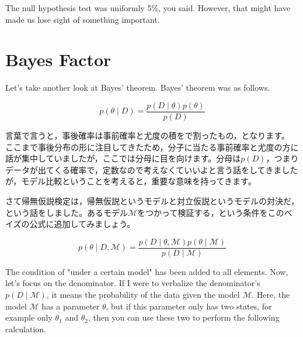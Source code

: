 \documentclass{ltjbook}
\begin{document}
The null hypothesis test was uniformly 5\%, you said. However, that might have made us lose sight of something important.



\section{Bayes Factor}

Let's take another look at Bayes' theorem. Bayes' theorem was as follows.

\[ p(\theta\mid D) = \frac{p(D\mid \theta)p(\theta)}{p(D)} \]

言葉で言うと，事後確率は事前確率と尤度の積をで割ったもの，となります。
ここまで事後分布の形に注目してきたため，分子に当たる事前確率と尤度の方に話が集中していましたが，ここでは分母に目を向けます。分母は$p(D)$，つまりデータが出てくる確率で，定数なので考えなくていいよと言う話をしてきましたが，モデル比較ということを考えると，重要な意味を持ってきます。

さて帰無仮説検定は，帰無仮説というモデルと対立仮説というモデルの対決だ，という話をしました。あるモデル$\mathcal{M}$をつかって検証する，という条件をこのベイズの公式に追加してみましょう。

\[ p(\theta \mid D,\mathcal{M}) = \frac{p(D\mid \theta,\mathcal{M})p(\theta \mid \mathcal{M})}{p(D\mid \mathcal{M})} \]

The condition of "under a certain model" has been added to all elements. Now, let's focus on the denominator. If I were to verbalize the denominator's $p(D\mid \mathcal{M})$, it means the probability of the data given the model $\mathcal{M}$.
Here, the model $\mathcal{M}$ has a parameter $\theta$, but if this parameter only has two states, for example only $\theta_1$ and $\theta_2$, then you can use these two to perform the following calculation.
\end{document}
